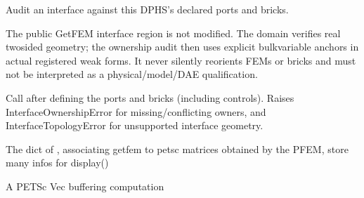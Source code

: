 \documentclass[letterpaper,10pt,english]{sphinxmanual}
\begin{document}
\begin{fulllineitems}
\begin{fulllineitems}
\end{fulllineitems}


\begin{fulllineitems}
\label{\detokenize{scrimp:scrimp.dphs.DPHS.audit_interface_ownership}}
\pysigstartsignatures
\pysiglinewithargsret
{}
{\sphinxparamcomma {}\sphinxparamcomma {}}
{}
\pysigstopsignatures
\sphinxAtStartPar
Audit an interface against this DPHS’s declared ports and bricks.

\sphinxAtStartPar
The public GetFEM interface region is not modified. The domain
verifies real two\sphinxhyphen{}sided geometry; the ownership audit then uses
 explicit bulk\sphinxhyphen{}variable anchors in actual registered weak
forms. It never silently reorients FEMs or bricks and must not
be interpreted as a physical/model/DAE qualification.

\sphinxAtStartPar
Call after defining the ports and bricks (including controls).
Raises InterfaceOwnershipError for missing/conflicting owners,
and InterfaceTopologyError for unsupported interface geometry.

\end{fulllineitems}


\begin{fulllineitems}
\label{\detokenize{scrimp:scrimp.dphs.DPHS.bricks}}
\pysigstartsignatures
\pysigline
{}
\pysigstopsignatures
\sphinxAtStartPar
The dict of , associating getfem  to petsc matrices obtained by the PFEM, store many infos for display()

\end{fulllineitems}


\begin{fulllineitems}
\label{\detokenize{scrimp:scrimp.dphs.DPHS.buffer}}
\pysigstartsignatures
\pysigline
{}
\pysigstopsignatures
\sphinxAtStartPar
A PETSc Vec buffering computation


\end{fulllineitems}
\end{fulllineitems}
\end{document}
